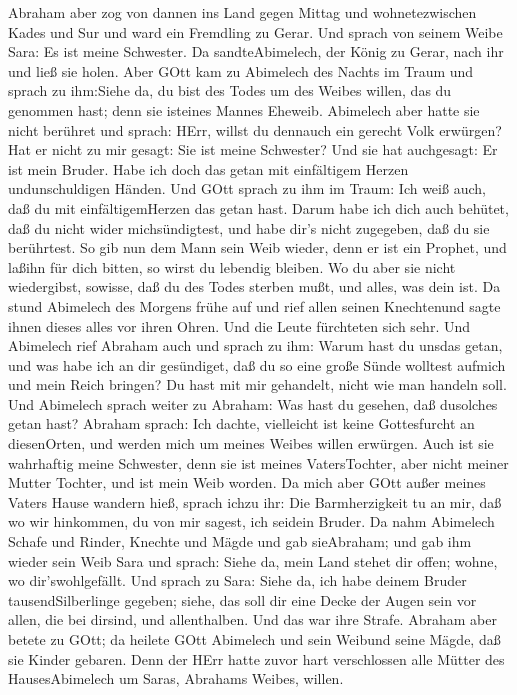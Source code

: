  Abraham aber zog von dannen ins Land gegen Mittag und
wohnetezwischen Kades und Sur und ward ein Fremdling zu Gerar.
 Und sprach von seinem Weibe Sara: Es ist meine Schwester.
Da sandteAbimelech, der König zu Gerar, nach ihr und ließ sie holen.
 Aber GOtt kam zu Abimelech des Nachts im Traum und sprach
zu ihm:Siehe da, du bist des Todes um des Weibes willen, das du genommen
hast; denn sie isteines Mannes Eheweib.  Abimelech aber
hatte sie nicht berühret und sprach: HErr, willst du dennauch ein
gerecht Volk erwürgen?  Hat er nicht zu mir gesagt: Sie ist
meine Schwester? Und sie hat auchgesagt: Er ist mein Bruder. Habe ich
doch das getan mit einfältigem Herzen undunschuldigen Händen.
 Und GOtt sprach zu ihm im Traum: Ich weiß auch, daß du mit
einfältigemHerzen das getan hast. Darum habe ich dich auch behütet, daß
du nicht wider michsündigtest, und habe dir's nicht zugegeben, daß du
sie berührtest.  So gib nun dem Mann sein Weib wieder, denn
er ist ein Prophet, und laßihn für dich bitten, so wirst du lebendig
bleiben. Wo du aber sie nicht wiedergibst, sowisse, daß du des Todes
sterben mußt, und alles, was dein ist.  Da stund Abimelech
des Morgens frühe auf und rief allen seinen Knechtenund sagte ihnen
dieses alles vor ihren Ohren. Und die Leute fürchteten sich sehr.
 Und Abimelech rief Abraham auch und sprach zu ihm: Warum
hast du unsdas getan, und was habe ich an dir gesündiget, daß du so eine
große Sünde wolltest aufmich und mein Reich bringen? Du hast mit mir
gehandelt, nicht wie man handeln soll.  Und Abimelech
sprach weiter zu Abraham: Was hast du gesehen, daß dusolches getan hast?
 Abraham sprach: Ich dachte, vielleicht ist keine
Gottesfurcht an diesenOrten, und werden mich um meines Weibes willen
erwürgen.  Auch ist sie wahrhaftig meine Schwester, denn
sie ist meines VatersTochter, aber nicht meiner Mutter Tochter, und ist
mein Weib worden.  Da mich aber GOtt außer meines Vaters
Hause wandern hieß, sprach ichzu ihr: Die Barmherzigkeit tu an mir, daß
wo wir hinkommen, du von mir sagest, ich seidein Bruder. 
Da nahm Abimelech Schafe und Rinder, Knechte und Mägde und gab
sieAbraham; und gab ihm wieder sein Weib Sara  und sprach:
Siehe da, mein Land stehet dir offen; wohne, wo dir'swohlgefällt.
 Und sprach zu Sara: Siehe da, ich habe deinem Bruder
tausendSilberlinge gegeben; siehe, das soll dir eine Decke der Augen
sein vor allen, die bei dirsind, und allenthalben. Und das war ihre
Strafe.  Abraham aber betete zu GOtt; da heilete GOtt
Abimelech und sein Weibund seine Mägde, daß sie Kinder gebaren.
 Denn der HErr hatte zuvor hart verschlossen alle Mütter
des HausesAbimelech um Saras, Abrahams Weibes, willen.

